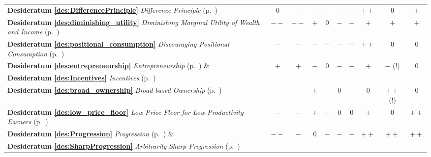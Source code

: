 \begin{landscape}
\begin{longtabu}{p{4cm}ccccccccc}
\textbf{Desideratum \ref{des:DifferencePrinciple}} \emph{Difference Principle} (p.~\pageref{des:DifferencePrinciple})   \vspace{10pt}
&$0$			&$-$			&$-$				&$-$			&$-$			&$-$				&$++$		&$0$				&$+$\\
\textbf{Desideratum \ref{des:diminishing_utility}} \emph{Diminishing Marginal Utility of Wealth and Income} (p.~\pageref{des:diminishing_utility})\vspace{10pt}
&$--$			&$--$			&$+$				&$0$			&$-$			&$-$				&$+$			&$+$				&$+$\\ %
\textbf{Desideratum \ref{des:positional_consumption}} \emph{Discouraging Positional Consumption} (p.~\pageref{des:positional_consumption})\vspace{10pt}
&$-$			&$-$			&$-$				&$-$			&$-$			&$-$				&$++$		&$0$				&$0$\\ %
\textbf{Desideratum \ref{des:entrepreneurship}} \emph{Entrepreneurship} (p.~\pageref{des:entrepreneurship}) \&
&$+$			&$+$			&$-$				&$0$			&$-$			&$-$				&$+$			&$-$ (!)			&$0$\\ %
\textbf{Desideratum \ref{des:Incentives}} \emph{Incentives} (p.~\pageref{des:Incentives})\vspace{10pt}
&			&			&				&			&			&				&			&				&\\
\textbf{Desideratum \ref{des:broad_ownership}} \emph{Broad-based Ownership} (p.~\pageref{des:broad_ownership})\vspace{10pt}
&$-$			&$-$			&$+$				&$-$			&$0$			&$-$				&$0$			&$++$ (!)			&$0$\\ %
\textbf{Desideratum \ref{des:low_price_floor}} \emph{Low Price Floor for Low-Productivity Earners} (p.~\pageref{des:LowPriceFloor})\vspace{10pt}
&$-$			&$-$			&$+$				&$-$			&$0$			&$0$				&$+$			&$0$				&$++$\\ %
\textbf{Desideratum \ref{des:Progression}} \emph{Progression} (p.~\pageref{des:Progression}) \&
&$--$			&$-$			&$0$				&$-$			&$-$			&$-$				&$++$		&$++$			&$++$\\
\textbf{Desideratum \ref{des:SharpProgression}} \emph{Arbitrarily Sharp Progression} (p.~\pageref{des:SharpProgression})\vspace{10pt}
&			&			&				&			&			&				&			&				&\\ %

\end{longtabu}
\end{landscape}
